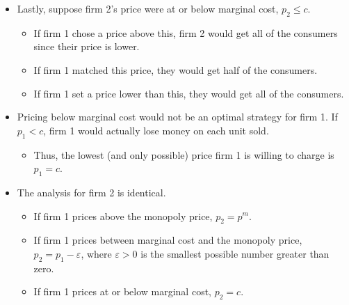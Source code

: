 \documentclass[12pt, oneside]{article}
\begin{document}
\begin{itemize}
    \item Lastly, suppose firm 2's price were at or below marginal cost, $p_2 \leq c$.
    \begin{itemize}
        \item If firm 1 chose a price above this, firm 2 would get all of the consumers since their price is lower.
        \item If firm 1 matched this price, they would get half of the consumers.
        \item If firm 1 set a price lower than this, they would get all of the consumers.
    \end{itemize}
    \item Pricing below marginal cost would not be an optimal strategy for firm 1. If $p_1 < c$, firm 1 would actually lose money on each unit sold.
    \begin{itemize}
        \item Thus, the lowest (and only possible) price firm 1 is willing to charge is $p_1 = c$.
    \end{itemize}
\end{itemize}

\begin{itemize}
    \item The analysis for firm 2 is identical.
    \begin{itemize}
        \item If firm 1 prices above the monopoly price, $p_2 = p^m$.
        \item If firm 1 prices between marginal cost and the monopoly price, $p_2 = p_1 - \varepsilon$, where $\varepsilon > 0$ is the smallest possible number greater than zero.
        \item If firm 1 prices at or below marginal cost, $p_2 = c$.
    \end{itemize}
\end{itemize}
\end{document}
